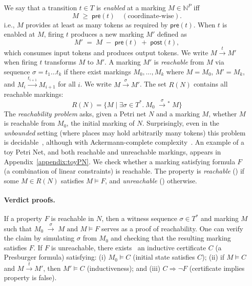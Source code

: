 \noindent We say that a transition \(t\in T\) is \emph{enabled} at a marking \(M\in\mathbb N^P\) iff
\[
M \;\ge\; \mathsf{pre}(t)
\quad(\text{coordinate‐wise}).
\]
i.e., $M$ provides at least as many tokens as required by $\mathsf{pre}(t)$.
When $t$ is enabled at $M$, firing $t$ produces a new marking $M'$ defined as
\[
M' \;=\; M \;-\;\mathsf{pre}(t)\;+\;\mathsf{post}(t),
\]
which consumes input tokens and produces output tokens. We write $M \xrightarrow{t} M'$ when firing $t$ transforms $M$ to $M'$.
%
A marking \(M'\) is \emph{reachable} from $M$ via sequence $\sigma = t_1 \ldots t_k$ if there exist markings $M_0, \ldots, M_k$ where $M = M_0$, $M' = M_k$, and $M_i \xrightarrow{t_{i+1}} M_{i+1}$ for all $i$. We write $M \xrightarrow{\sigma} M'$.
The set $R(N)$ contains all reachable markings:
\[
R(N) = \{M \mid \exists \sigma \in T^* .\ M_0 \;\xrightarrow{\sigma}\!^*\; M\}
\]
%
The \emph{reachability problem} asks, given a Petri net $N$ and a marking $M$, whether $M$ is reachable from $M_0$, the initial marking of $N$.  Surprisingly, even in the
\emph{unbounded} setting (where places may hold arbitrarily many tokens) this problem is
decidable~\cite{Ma81,Ko82,La92}, although with
Ackermann-complete complexity~\cite{CzWo22,Le22}.
%
An example of a toy Petri Net, and both reachable and unreachable markings, appears in Appendix~\ref{appendix:toyPN}.
%
We check whether a marking satisfying formula $F$ (a combination of linear constraints) is reachable. The property is \textit{reachable} (\sat) if some $M \in R(N)$ satisfies $M \models F$, and \textit{unreachable} (\unsat) otherwise. 

\paragraph{Verdict proofs.} 

If a property $F$ is reachable in $N$, then a witness sequence $\sigma \in T^*$ and marking $M$ such that $ M_0 \;\xrightarrow{\sigma}\; M \text{ and }M \models F$
serves as a proof of reachability. One can verify the claim by simulating $\sigma$ from $M_0$ and checking that the resulting marking satisfies $F$.
%
If $F$ is unreachable, there exists~\cite{Le09} an inductive certificate $C$ (a Presburger formula) satisfying:
(i) $M_0 \models C$ (initial state satisfies $C$);
(ii) if $M \models C$ and $M \xrightarrow{t} M'$, then $M' \models C$ (inductiveness); and
(iii) $C \Rightarrow \neg F$ (certificate implies property is false).

